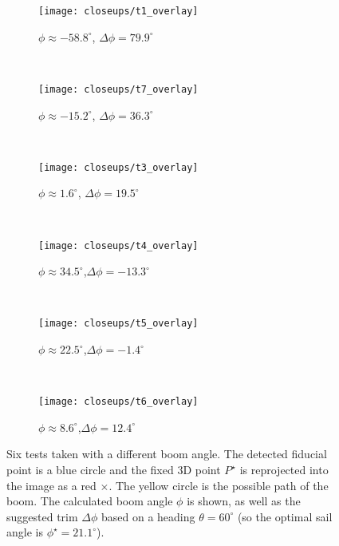 \documentclass[letterpaper, 10 pt, conference]{ieeeconf}  %
\begin{document}
\begin{figure*}[htbp]
        \centering
         \begin{subfigure}[b]{0.3\textwidth}
                \texttt{[image: closeups/t1\_overlay]}
                \caption{$\phi \approx -58.8^\circ$, $\Delta \phi = 79.9^\circ$}
                \label{fig:t1}
        \end{subfigure}
        ~
        \begin{subfigure}[b]{0.3\textwidth}
                \texttt{[image: closeups/t7\_overlay]}
                \caption{$\phi \approx -15.2^\circ$, $\Delta \phi = 36.3^\circ$}
                \label{fig:t2}
        \end{subfigure}
        ~
        \begin{subfigure}[b]{0.3\textwidth}
                \texttt{[image: closeups/t3\_overlay]}
                \caption{$\phi \approx 1.6^\circ$, $\Delta \phi = 19.5^\circ$}
                \label{fig:t3}
        \end{subfigure}
		\\
		\begin{subfigure}[b]{0.3\textwidth}
                \texttt{[image: closeups/t4\_overlay]}
                \caption{$\phi \approx 34.5^\circ$,$\Delta \phi = -13.3^\circ$}
                \label{fig:t4}
        \end{subfigure}
        ~
        \begin{subfigure}[b]{0.3\textwidth}
                \texttt{[image: closeups/t5\_overlay]}
                \caption{$\phi \approx 22.5^\circ$,$\Delta \phi = -1.4^\circ$}
                \label{fig:t5}
        \end{subfigure}
        ~
        \begin{subfigure}[b]{0.3\textwidth}
                \texttt{[image: closeups/t6\_overlay]}
                \caption{$\phi \approx 8.6^\circ$,$\Delta \phi = 12.4^\circ$}
                \label{fig:t6}
        \end{subfigure}
        
        \caption{Six tests taken with a different boom angle. The detected fiducial point is a blue circle and  the fixed 3D point $P^\star$ is reprojected into the image as a red $\times$. The yellow circle is the possible path of the boom. The calculated boom angle $\phi$ is shown, as well as the suggested trim $\Delta \phi$ based on a heading $\theta = 60^\circ$ (so the optimal sail angle is $\phi^\star = 21.1^\circ$).}
        \label{fig:results}
\end{figure*}
\end{document}
